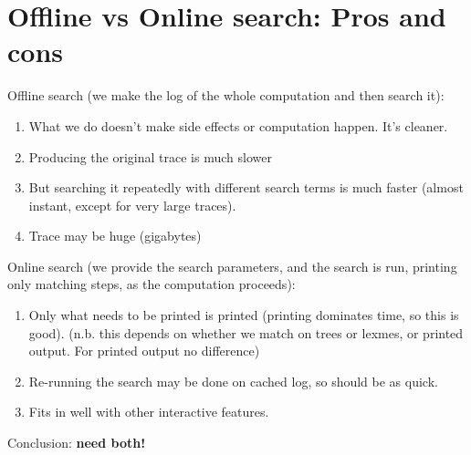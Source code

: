 \documentclass[10pt]{article}
\begin{document}
\section{Offline vs Online search: Pros and cons}

Offline search (we make the log of the whole computation and then search it):

\begin{enumerate}
\item What we do doesn't make side effects or computation happen. It's cleaner.
\item Producing the original trace is much slower
\item But searching it repeatedly with different search terms is much faster (almost instant, except for very large traces).
\item Trace may be huge (gigabytes)
\end{enumerate}

\noindent Online search (we provide the search parameters, and the search is run, printing only matching steps, as the computation proceeds):

\begin{enumerate}
\item Only what needs to be printed is printed (printing dominates time, so this is good). (n.b. this depends on whether we match on trees or lexmes, or printed output. For printed output no difference)
\item Re-running the search may be done on cached log, so should be as quick.
\item Fits in well with other interactive features.
\end{enumerate}

\noindent Conclusion: \textbf{need both!}
\end{document}
